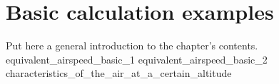 \documentclass[[12pt,twoside]{book}
\begin{document}
%
%
\chapter%
   [Basic calculation examples]%
   {Basic calculation examples}
\label{chap:Basics}

\setcounter{minitocdepth}{2}%
\minitoc %

\vspace{\baselineskip}

\noindent
Put here a general introduction to the chapter's contents.
%
{equivalent_airspeed_basic_1}
{equivalent_airspeed_basic_2}
{characteristics_of_the_air_at_a_certain_altitude}
\end{document}
